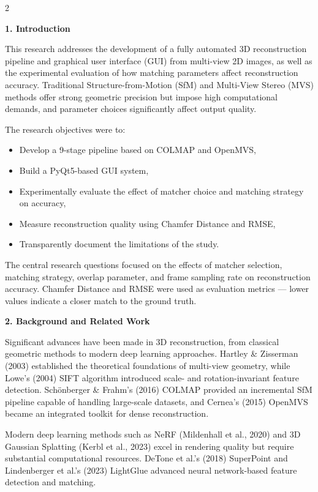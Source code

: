 \begin{multicols}{2}
\setlength{\parskip}{5pt}
\sloppy

\noindent\textbf{1. Introduction}

This research addresses the development of a fully automated 3D reconstruction pipeline and graphical user interface (GUI) from multi-view 2D images, as well as the experimental evaluation of how matching parameters affect reconstruction accuracy. Traditional Structure-from-Motion (SfM) and Multi-View Stereo (MVS) methods offer strong geometric precision but impose high computational demands, and parameter choices significantly affect output quality.

The research objectives were to:
\begin{itemize}
    \item Develop a 9-stage pipeline based on COLMAP and OpenMVS,
    \item Build a PyQt5-based GUI system,
    \item Experimentally evaluate the effect of matcher choice and matching strategy on accuracy,
    \item Measure reconstruction quality using Chamfer Distance and RMSE,
    \item Transparently document the limitations of the study.
\end{itemize}

The central research questions focused on the effects of matcher selection, matching strategy, overlap parameter, and frame sampling rate on reconstruction accuracy. Chamfer Distance and RMSE were used as evaluation metrics — lower values indicate a closer match to the ground truth.

\noindent\textbf{2. Background and Related Work}

Significant advances have been made in 3D reconstruction, from classical geometric methods to modern deep learning approaches. Hartley \& Zisserman (2003) established the theoretical foundations of multi-view geometry, while Lowe's (2004) SIFT algorithm introduced scale- and rotation-invariant feature detection. Sch{\"o}nberger \& Frahm's (2016) COLMAP provided an incremental SfM pipeline capable of handling large-scale datasets, and Cernea's (2015) OpenMVS became an integrated toolkit for dense reconstruction.

Modern deep learning methods such as NeRF (Mildenhall et al., 2020) and 3D Gaussian Splatting (Kerbl et al., 2023) excel in rendering quality but require substantial computational resources. DeTone et al.'s (2018) SuperPoint and Lindenberger et al.'s (2023) LightGlue advanced neural network-based feature detection and matching.


\end{multicols}
